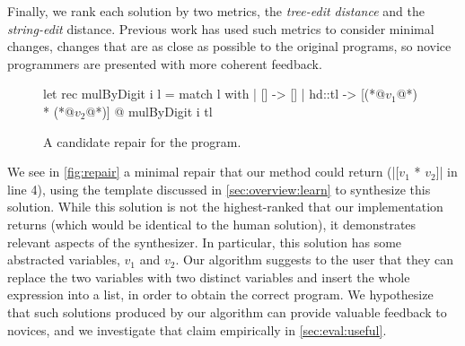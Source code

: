  Finally, we rank each solution by two metrics, the
\emph{tree-edit distance} and the \emph{string-edit} distance. Previous work
\citep{Lerner2007-dt, Wang_2018, Gulwani_2018} has used such metrics to consider
minimal changes, \ie changes that are as close as possible to the original
programs, so novice programmers are presented with more coherent feedback.

\begin{figure}[ht]
  \begin{ecode}
  let rec mulByDigit i l =
    match l with
    | []     -> []
    | hd::tl -> [(*@$v_1$@*) * (*@$v_2$@*)] @ mulByDigit i tl
  \end{ecode}
  \caption{A candidate repair for the \mbd program.}
  \label{fig:repair}
  \end{figure}

 We see in \autoref{fig:repair} a minimal repair that our
method could return (|[$v_1$ * $v_2$]| in line 4), using the template discussed
in \autoref{sec:overview:learn} to synthesize this solution. While this solution
is not the highest-ranked that our implementation returns (which would be
identical to the human solution), it demonstrates relevant aspects of the
synthesizer. In particular, this solution has some abstracted variables, $v_1$
and $v_2$. Our algorithm suggests to the user that they can replace the two
variables with two distinct variables and insert the whole expression into a
list, in order to obtain the correct program. We hypothesize that such solutions
produced by our algorithm can provide valuable feedback to novices, and we
investigate that claim empirically in \autoref{sec:eval:useful}.
